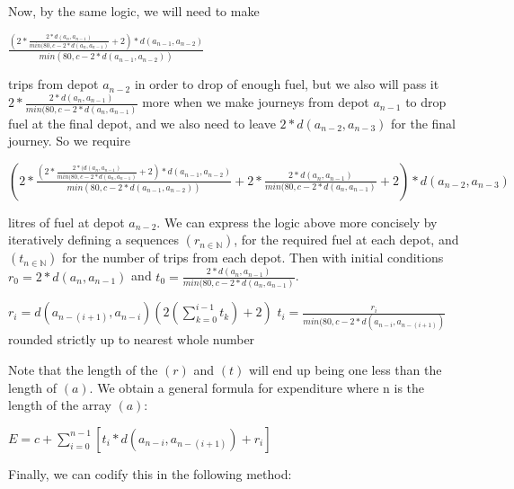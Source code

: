 \documentclass{homework}
\newcommand*{\N}{\mathbb N}
\begin{document}
\newline\newline
Now, by the same logic, we will need to make 
\newline\begin{center}
\large $\frac{(2*\frac{2*d(a_n, a_{n-1})}{min(80, c - 2*d(a_n, a_{n-1})} + 2)*d(a_{n-1},a_{n-2})}{min(80, c - 2*d(a_{n-1},a_{n-2}))}$ 
\newline\end{center}
trips from depot $a_{n-2}$ in order to drop of enough fuel, but we also will pass it $2*\frac{2*d(a_n, a_{n-1})}{min(80, c - 2*d(a_n, a_{n-1})}$ more when we make journeys from depot $a_{n-1}$ to drop fuel at the final depot, and we also need to leave $2*d(a_{n-2},a_{n-3})$ for the final journey. So we require 
\newline\begin{center}
\large $(2*\frac{(2*\frac{2*(d(a_n, a_{n-1})}{min(80, c - 2*d(a_n, a_{n-1})} + 2)*d(a_{n-1},a_{n-2})}{min(80, c - 2*d(a_{n-1},a_{n-2}))} + 2*\frac{2*d(a_n, a_{n-1})}{min(80, c - 2*d(a_n, a_{n-1})} + 2)*d(a_{n-2},a_{n-3})$
\newline\end{center}
litres of fuel at depot $a_{n-2}$. 
\newline\newline
We can express the logic above more concisely by iteratively defining a sequences $(r_{n\in\N})$, for the required fuel at each depot, and $(t_{n\in\N})$ for the number of trips from each depot. Then with initial conditions $r_0 = 2*d(a_n, a_{n-1})$ and $t_0 = \frac{2*d(a_n, a_{n-1})}{min(80, c - 2*d(a_n, a_{n-1})}$. 
\newline\begin{center}
\large$r_i = d(a_{n-(i+1)}, a_{n-i})(2(\sum_{k=0}^{i-1}t_k)+2)$\newline\newline
\large$t_i = \frac{r_i}{min(80,c-2*d(a_{n-i},a_{n-(i+1)})}$ rounded strictly up to nearest whole number\newline
\end{center}
Note that the length of the $(r)$ and $(t)$ will end up being one less than the length of $(a)$. We obtain a general formula for expenditure where n is the length of the array $(a)$:
\begin{center}
\large $E = c + \sum_{i=0}^{n-1}[t_i*d(a_{n-i},a_{n-(i+1)}) + r_i]$
\end{center}
Finally, we can codify this in the following method:
\end{document}
